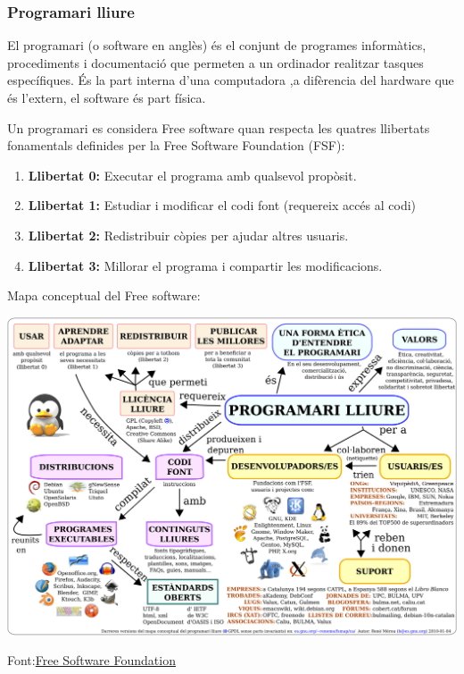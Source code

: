 \subsubsection{Programari lliure}

El programari (o software en anglès) és el conjunt de programes informàtics, procediments i documentació que permeten a un ordinador realitzar tasques específiques. És la part interna d'una computadora ,a difèrencia del hardware que és l'extern, el software és part física.

Un programari es considera Free software quan respecta les quatres llibertats fonamentals definides per la Free Software Foundation (FSF):
\begin{enumerate}
 \item  \textbf{Llibertat 0:} Executar el programa amb qualsevol propòsit.
 \item  \textbf{Llibertat 1:} Estudiar i modificar el codi font (requereix accés al codi)
 \item  \textbf{Llibertat 2:} Redistribuir còpies per ajudar altres usuaris.
 \item  \textbf{Llibertat 3:} Millorar el programa i compartir les modificacions.
\end{enumerate}

Mapa conceptual del Free software:
\begin{center}
\hspace{-27mm}
 \includegraphics[scale=0.1]{./figures/mapa.png}
\end{center}

Font:\href{https://www.fsf.org/}{Free Software Foundation}

